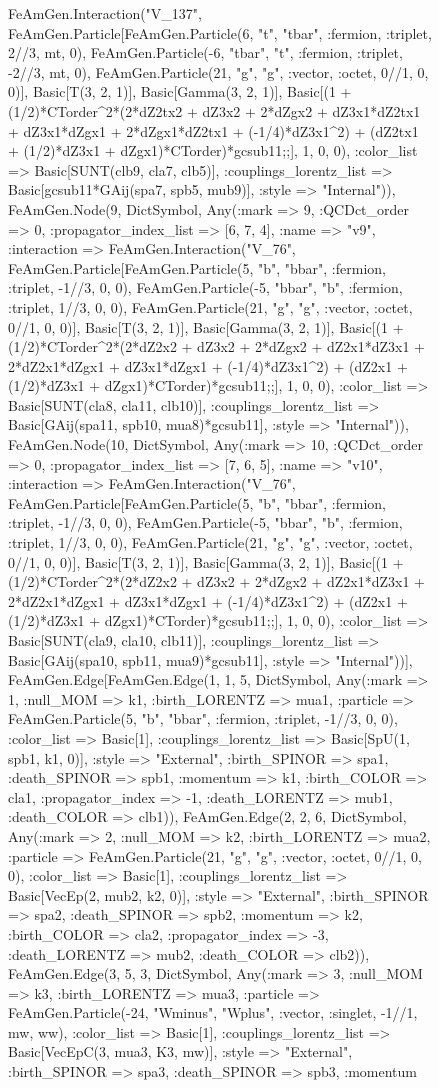 \documentclass{revtex4}
\begin{document}
\begin{figure}[!htb]
\begin{center}
{FeAmGen.Interaction("V_137", FeAmGen.Particle[FeAmGen.Particle(6, "t", "tbar", :fermion, :triplet, 2//3, mt, 0), FeAmGen.Particle(-6, "tbar", "t", :fermion, :triplet, -2//3, mt, 0), FeAmGen.Particle(21, "g", "g", :vector, :octet, 0//1, 0, 0)], Basic[T(3, 2, 1)], Basic[Gamma(3, 2, 1)], Basic[(1 + (1/2)*CTorder^2*(2*dZ2tx2 + dZ3x2 + 2*dZgx2 + dZ3x1*dZ2tx1 + dZ3x1*dZgx1 + 2*dZgx1*dZ2tx1 + (-1/4)*dZ3x1^2) + (dZ2tx1 + (1/2)*dZ3x1 + dZgx1)*CTorder)*gcsub11;;], 1, 0, 0), :color_list => Basic[SUNT(clb9, cla7, clb5)], :couplings_lorentz_list => Basic[gcsub11*GAij(spa7, spb5, mub9)], :style => "Internal")), FeAmGen.Node(9, Dict{Symbol, Any}(:mark => 9, :QCDct_order => 0, :propagator_index_list => [6, 7, 4], :name => "v9", :interaction => FeAmGen.Interaction("V_76", FeAmGen.Particle[FeAmGen.Particle(5, "b", "bbar", :fermion, :triplet, -1//3, 0, 0), FeAmGen.Particle(-5, "bbar", "b", :fermion, :triplet, 1//3, 0, 0), FeAmGen.Particle(21, "g", "g", :vector, :octet, 0//1, 0, 0)], Basic[T(3, 2, 1)], Basic[Gamma(3, 2, 1)], Basic[(1 + (1/2)*CTorder^2*(2*dZ2x2 + dZ3x2 + 2*dZgx2 + dZ2x1*dZ3x1 + 2*dZ2x1*dZgx1 + dZ3x1*dZgx1 + (-1/4)*dZ3x1^2) + (dZ2x1 + (1/2)*dZ3x1 + dZgx1)*CTorder)*gcsub11;;], 1, 0, 0), :color_list => Basic[SUNT(cla8, cla11, clb10)], :couplings_lorentz_list => Basic[GAij(spa11, spb10, mua8)*gcsub11], :style => "Internal")), FeAmGen.Node(10, Dict{Symbol, Any}(:mark => 10, :QCDct_order => 0, :propagator_index_list => [7, 6, 5], :name => "v10", :interaction => FeAmGen.Interaction("V_76", FeAmGen.Particle[FeAmGen.Particle(5, "b", "bbar", :fermion, :triplet, -1//3, 0, 0), FeAmGen.Particle(-5, "bbar", "b", :fermion, :triplet, 1//3, 0, 0), FeAmGen.Particle(21, "g", "g", :vector, :octet, 0//1, 0, 0)], Basic[T(3, 2, 1)], Basic[Gamma(3, 2, 1)], Basic[(1 + (1/2)*CTorder^2*(2*dZ2x2 + dZ3x2 + 2*dZgx2 + dZ2x1*dZ3x1 + 2*dZ2x1*dZgx1 + dZ3x1*dZgx1 + (-1/4)*dZ3x1^2) + (dZ2x1 + (1/2)*dZ3x1 + dZgx1)*CTorder)*gcsub11;;], 1, 0, 0), :color_list => Basic[SUNT(cla9, cla10, clb11)], :couplings_lorentz_list => Basic[GAij(spa10, spb11, mua9)*gcsub11], :style => "Internal"))], FeAmGen.Edge[FeAmGen.Edge(1, 1, 5, Dict{Symbol, Any}(:mark => 1, :null_MOM => k1, :birth_LORENTZ => mua1, :particle => FeAmGen.Particle(5, "b", "bbar", :fermion, :triplet, -1//3, 0, 0), :color_list => Basic[1], :couplings_lorentz_list => Basic[SpU(1, spb1, k1, 0)], :style => "External", :birth_SPINOR => spa1, :death_SPINOR => spb1, :momentum => k1, :birth_COLOR => cla1, :propagator_index => -1, :death_LORENTZ => mub1, :death_COLOR => clb1)), FeAmGen.Edge(2, 2, 6, Dict{Symbol, Any}(:mark => 2, :null_MOM => k2, :birth_LORENTZ => mua2, :particle => FeAmGen.Particle(21, "g", "g", :vector, :octet, 0//1, 0, 0), :color_list => Basic[1], :couplings_lorentz_list => Basic[VecEp(2, mub2, k2, 0)], :style => "External", :birth_SPINOR => spa2, :death_SPINOR => spb2, :momentum => k2, :birth_COLOR => cla2, :propagator_index => -3, :death_LORENTZ => mub2, :death_COLOR => clb2)), FeAmGen.Edge(3, 5, 3, Dict{Symbol, Any}(:mark => 3, :null_MOM => k3, :birth_LORENTZ => mua3, :particle => FeAmGen.Particle(-24, "Wminus", "Wplus", :vector, :singlet, -1//1, mw, ww), :color_list => Basic[1], :couplings_lorentz_list => Basic[VecEpC(3, mua3, K3, mw)], :style => "External", :birth_SPINOR => spa3, :death_SPINOR => spb3, :momentum }
\end{center}
\end{figure}
\end{document}
